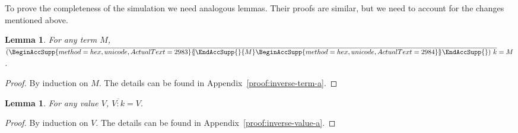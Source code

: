 \documentclass{LMCS}
\newtheorem{lemma}[theorem]{Lemma}
\newcommand{\App}[1]{The details can be found in Appendix~\ref{proof:#1}}
\newcommand*{\llbrace}{\BeginAccSupp{method=hex,unicode,ActualText=2983}\textnormal{\usefont{OMS}{lmr}{m}{n}\char102}\mathchoice{\mkern-4.05mu}{\mkern-4.05mu}{\mkern-4.3mu}{\mkern-4.8mu}\textnormal{\usefont{OMS}{lmr}{m}{n}\char106}\EndAccSupp{}}
\newcommand*{\rrbrace}{\BeginAccSupp{method=hex,unicode,ActualText=2984}\textnormal{\usefont{OMS}{lmr}{m}{n}\char106}\mathchoice{\mkern-4.05mu}{\mkern-4.05mu}{\mkern-4.3mu}{\mkern-4.8mu}\textnormal{\usefont{OMS}{lmr}{m}{n}\char103}\EndAccSupp{}}
\newcommand{\cps}[1]{\llbrace{#1}\rrbrace}
\begin{document}
To prove the completeness of the simulation we need analogous lemmas.
Their proofs are similar, but we need to account for the changes mentioned
above. 

\begin{lemma}
  \label{lem:inverse-term-a} For any term $M$, $\overline{(\cps M)~k}=M$.
\end{lemma}
\begin{proof}
  By induction on $M$. \App{inverse-term-a}.
\end{proof}

\begin{lemma}
  \label{lem:inverse-value-a} For any value $V$, $\overline{V:k}=V$.
\end{lemma}
\begin{proof}
  By induction on $V$. \App{inverse-value-a}.
\end{proof}
\end{document}
